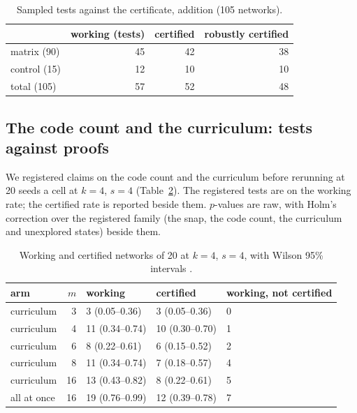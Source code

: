 \documentclass[11pt]{article}
\begin{document}
\begin{table}[t]
\centering
\caption{Sampled tests against the certificate, addition (105 networks).}
\label{tab:e1}
\begin{tabular}{lrrr}
\toprule
 & working (tests) & certified & robustly certified \\
\midrule
matrix (90) & 45 & 42 & 38 \\
control (15) & 12 & 10 & 10 \\
\midrule
total (105) & 57 & 52 & 48 \\
\bottomrule
\end{tabular}
\end{table}

\subsection{The code count and the curriculum: tests against proofs}
\label{sec:codes-curriculum}

We registered claims on the code count and the curriculum before rerunning at 20 seeds a cell at
$k = 4$, $s = 4$ (Table~\ref{tab:e3e4}). The registered tests are on the working rate; the certified
rate is reported beside them. $p$-values are raw, with Holm's correction
\citep{holm-1979-sequentially-rejective} over the registered family (the snap, the code count, the
curriculum and unexplored states) beside them.

\begin{table}[t]
\centering
\caption{Working and certified networks of 20 at $k=4$, $s=4$, with Wilson 95\% intervals
\citep{wilson-1927-probable-inference}.}
\label{tab:e3e4}
\begin{tabular}{lrlll}
\toprule
arm & $m$ & working & certified & working, not certified \\
\midrule
curriculum & 3 & 3 (0.05--0.36) & 3 (0.05--0.36) & 0 \\
curriculum & 4 & 11 (0.34--0.74) & 10 (0.30--0.70) & 1 \\
curriculum & 6 & 8 (0.22--0.61) & 6 (0.15--0.52) & 2 \\
curriculum & 8 & 11 (0.34--0.74) & 7 (0.18--0.57) & 4 \\
curriculum & 16 & 13 (0.43--0.82) & 8 (0.22--0.61) & 5 \\
all at once & 16 & 19 (0.76--0.99) & 12 (0.39--0.78) & 7 \\
\bottomrule
\end{tabular}
\end{table}
\end{document}
